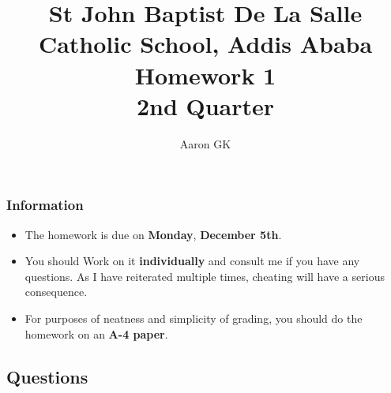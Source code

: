 \documentclass[9pt,addpoints]{exam}
\author{Aaron GK}
\begin{document}
	\title{St John Baptist De La Salle Catholic School, Addis Ababa\\
		\large Homework 1 \\
		2nd Quarter}
	\maketitle
	\begin{center}
		\subsubsection*{Information}
		\begin{itemize}
			\item The homework is due on \textbf{Monday}, \textbf{December 5th}.
			\item You should Work on it \textbf{individually} and consult me if you have any questions. As I have reiterated multiple times, cheating will have a serious consequence.
			\item For purposes of neatness and simplicity of grading, you should do the homework on an \textbf{A-4 paper}.
		\end{itemize}
	\end{center}
	\begin{center}
		\subsection*{Questions}
	\end{center}
\end{document}
